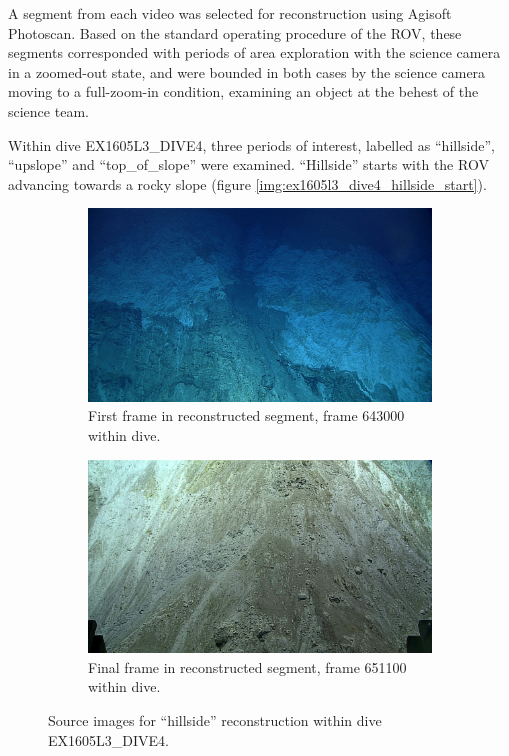 \documentclass[letterpaper,12pt]{article}
\begin{document}
A segment from each video was selected for reconstruction using Agisoft Photoscan.   Based on the standard operating procedure of the ROV, these segments corresponded with periods of area exploration with the science camera in a zoomed-out state, and were bounded in both cases by the science camera moving to a full-zoom-in condition, examining an object at the behest of the science team.    

Within dive EX1605L3\_DIVE4, three periods of interest, labelled as ``hillside'', ``upslope'' and ``top\_of\_slope'' were examined.   ``Hillside'' starts with the ROV advancing towards a rocky slope (figure \ref{img:ex1605l3_dive4_hillside_start}).

\begin{figure}
    \centering
    \begin{subfigure}[b]{0.48\textwidth}
        \includegraphics[width=\textwidth]{images/image_643000.png}
        \caption{First frame in reconstructed segment, frame 643000 within dive.}
        \label{fig:ex1605l3_dive4_hillside_begin}
    \end{subfigure}
    \begin{subfigure}[b]{0.48\textwidth}
        \includegraphics[width=\textwidth]{images/image_651100.png}
        \caption{Final frame in reconstructed segment, frame 651100 within dive.}
        \label{fig:ex1605l3_dive4_hillside_end}
    \end{subfigure}
    \caption{Source images for ``hillside'' reconstruction within dive EX1605L3\_DIVE4.}
\end{figure}
\end{document}
